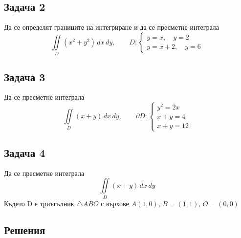 \documentclass[a4paper,fleqn,12pt]{article}
\theoremstyle{definition}
\begin{document}
\subsection*{Задача 2}
Да се определят границите на интегриране и да се пресметне интеграла
$$\iint\limits_D (x^2 + y^2) \, dx \, dy, \qquad D: \begin{cases} y = x , \quad y =2 \\ y = x + 2, \quad y = 6 \end{cases}$$

\subsection*{Задача 3}
Да се пресметне интеграла
$$\iint\limits_D (x+y) \, dx \, dy, \qquad \partial D: \begin{cases} y^2 = 2x \\ x+y = 4 \\ x+y = 12 \end{cases}$$

\subsection*{Задача 4}
Да се пресметне интеграла
$$\iint\limits_D (x+y) \, dx \, dy$$
Където D е триъгълник $\triangle ABO$ с върхове $A(1,0),\, B = (1,1),\, O = (0,0)$

\newpage
\subsection{Решения}
\end{document}
